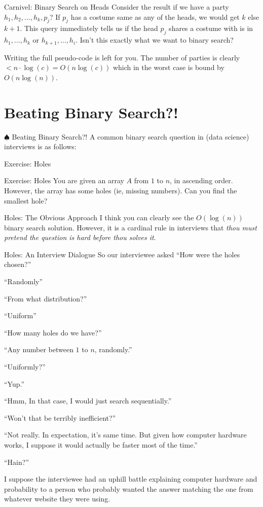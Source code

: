 \documentclass[9pt]{beamer}
\newenvironment{exbox}[1]{\begin{block}{Exercise: #1}}{\end{block}}
\begin{document}
\begin{frame}{Carnivel: Binary Search on Heads}
Consider the result if we have a party $h_1, h_2, \ldots, h_k, p_j$? If $p_j$ has a costume same as any of the heads, we would get $k$ else $k+1$. This query immediately tells us if the head $p_j$ shares a costume with is in $h_1, \ldots, h_k$ or $h_{k+1}, \ldots, h_i$. Isn't this exactly what we want to binary search?

Writing the full pseudo-code is left for you. The number of parties is clearly $< n \cdot \log(c) = O(n\log(c))$ which in the worst case is bound by $O(n\log(n))$.
\end{frame}

\section{Beating Binary Search?!}

\begin{frame}{$\spadesuit$ Beating Binary Search?!}
A common binary search question in (data science) interviews is as follows:
\end{frame}

\begin{frame}{Exercise: Holes}
\begin{exbox}{Holes}
You are given an array $A$ from $1$ to $n$, in ascending order. However, the array has some holes (ie, missing numbers). Can you find the smallest hole?
\end{exbox}
\end{frame}

\begin{frame}{Holes: The Obvious Approach}
I think you can clearly see the $O(\log(n))$ binary search solution. However, it is a cardinal rule in interviews that \emph{thou must pretend the question is hard before thou solves it}.
\end{frame}

\begin{frame}{Holes: An Interview Dialogue}
\small
So our interviewee asked ``How were the holes chosen?''

``Randomly''

``From what distribution?''

``Uniform''

``How many holes do we have?''

``Any number between $1$ to $n$, randomly.''

``Uniformly?''

``Yup.''

``Hmm, In that case, I would just search sequentially.''

``Won't that be terribly inefficient?''

``Not really. In expectation, it's same time. But given how computer hardware works, I suppose it would actually be faster most of the time.''

``Hain?''

I suppose the interviewee had an uphill battle explaining computer hardware and probability to a person who probably wanted the answer matching the one from whatever website they were using.
\end{frame}
\end{document}
